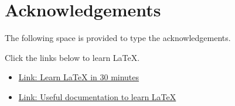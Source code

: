 \chapter*{Acknowledgements}
The following space is provided to type the acknowledgements.

Click the links below to learn LaTeX.

\begin{itemize}
	\item \href{https://www.overleaf.com/learn/latex/Learn_LaTeX_in_30_minutes}{Link: Learn LaTeX in 30 minutes}
	\item \href{https://www.overleaf.com/learn}{Link: Useful documentation to learn LaTeX}
\end{itemize}